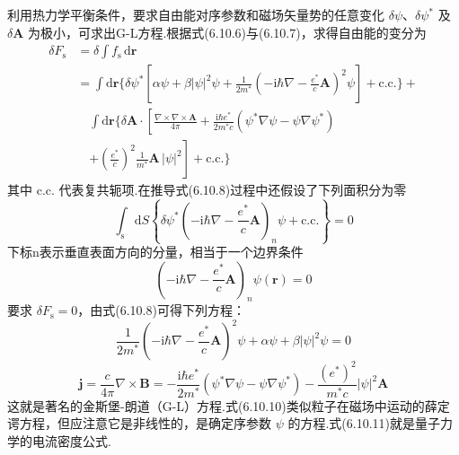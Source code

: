 利用热力学平衡条件，要求自由能对序参数和磁场矢量势的任意变化 $\delta\psi$、$\delta\psi^{*}$ 及 $\delta\boldsymbol{A}$ 为极小，可求出G-L方程.根据式(6.10.6)与(6.10.7)，求得自由能的变分为
\begin{equation}
\begin{aligned}
  \delta F_{\mathrm{s}}&=\delta\int f_{\mathrm{s}}\,\mathrm{d}\boldsymbol{r}\\
  &=\int\mathrm{d}\boldsymbol{r}\biggl\{\delta\psi^{*}
  \left[\alpha\psi+\beta|\psi|^{2}\psi
  +\frac{1}{2m^{*}}\left(-\mathrm{i}\hbar\nabla
  -\frac{e^{*}}{c}\boldsymbol{A}\right)^{2}\psi\right]
  +\mathrm{c.c.}\biggr\}+\\
  &\quad\int\mathrm{d}\boldsymbol{r}\biggl\{\delta\boldsymbol{A}\cdot
  \left[\frac{\nabla\times\nabla\times\boldsymbol{A}}{4\pi}
  +\frac{\mathrm{i}\hbar e^{*}}{2m^{*}c}
  \left(\psi^{*}\nabla\psi-\psi\nabla\psi^{*}\right)\right.\\
  &\quad\left.+\left(\frac{e^{*}}{c}\right)^{2}
  \frac{1}{m^{*}}\boldsymbol{A}\,|\psi|^{2}\right]+\mathrm{c.c.}\biggr\}
\end{aligned}
\end{equation}
其中 $\mathrm{c.c.}$ 代表复共轭项.在推导式(6.10.8)过程中还假设了下列面积分为零
\begin{equation*}
  \int_{\mathrm{s}}\mathrm{d}S\left\{\delta\psi^{*}
  \left(-\mathrm{i}\hbar\nabla-\frac{e^{*}}{c}\boldsymbol{A}\right)_{n}\psi
  +\mathrm{c.c.}\right\}=0
\end{equation*}
下标n表示垂直表面方向的分量，相当于一个边界条件
\begin{equation}
  \left(-\mathrm{i}\hbar\nabla-\frac{e^{*}}{c}\boldsymbol{A}\right)_{n}
  \psi(\boldsymbol{r})=0
\end{equation}
要求 $\delta F_{\mathrm{s}}=0$，由式(6.10.8)可得下列方程：
\begin{equation}
  \frac{1}{2m^{*}}\left(-\mathrm{i}\hbar\nabla
  -\frac{e^{*}}{c}\boldsymbol{A}\right)^{2}\psi
  +\alpha\psi+\beta|\psi|^{2}\psi=0
\end{equation}
\begin{equation}
  \boldsymbol{j}=\frac{c}{4\pi}\nabla\times\boldsymbol{B}
  =-\frac{\mathrm{i}\hbar e^{*}}{2m^{*}}
  \left(\psi^{*}\nabla\psi-\psi\nabla\psi^{*}\right)
  -\frac{\left(e^{*}\right)^{2}}{m^{*}c}|\psi|^{2}\boldsymbol{A}
\end{equation}
这就是著名的金斯堡-朗道（G-L）方程.式(6.10.10)类似粒子在磁场中运动的薛定谔方程，但应注意它是非线性的，是确定序参数 $\psi$ 的方程.式(6.10.11)就是量子力学的电流密度公式.

